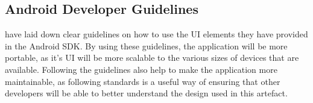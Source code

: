 \subsection{Android Developer Guidelines}
\cite{materialdesignguidelines} have laid down clear guidelines on how to use the UI elements they have provided in the Android SDK.
By using these guidelines, the application will be more portable, as it's UI will be more scalable to the various sizes of devices that are available.
Following the guidelines also help to make the application more maintainable, as following standards is a useful way of ensuring that other developers will be able to better understand the design used in this artefact.
